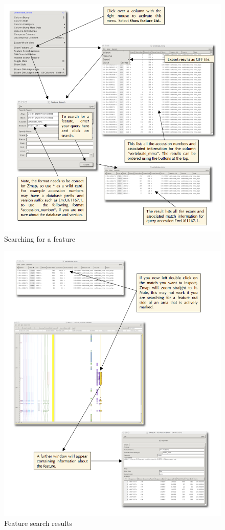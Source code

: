 \documentclass[letterpaper]{article}
\begin{document}
\begin{figure}
\centering
\color[rgb]{0.30980393,0.5058824,0.7411765}
\includegraphics[width=15.231cm]{img_feature_search.png}
\caption{Searching for a feature}
\label{img_feature_search}
\end{figure}

\begin{figure}
\centering
\color[rgb]{0.30980393,0.5058824,0.7411765}
\includegraphics[width=15.231cm]{img_feature_search_results.png}
\caption{Feature search results}
\label{img_feature_search_results}
\end{figure}
\end{document}
